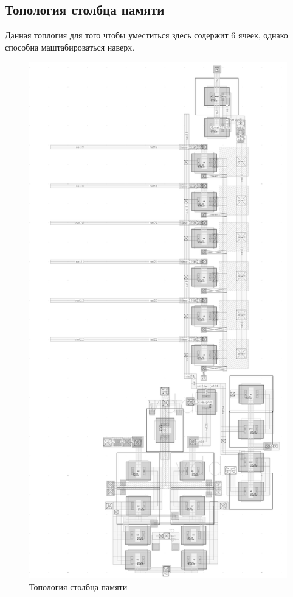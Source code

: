 \documentclass[a4paper,12pt]{article} %
\begin{document}
\subsection{Топология столбца памяти}
Данная топлогия для того чтобы уместиться здесь содержит 6 ячеек, однако способна маштабироваться наверх.
\begin{figure}[H]
  \begin{center}
    \includegraphics[width=0.8\linewidth]{array.png}
  \end{center}
  \caption{Топология столбца памяти}
  \label{pic:array_la}
\end{figure}
\newpage
\end{document}
